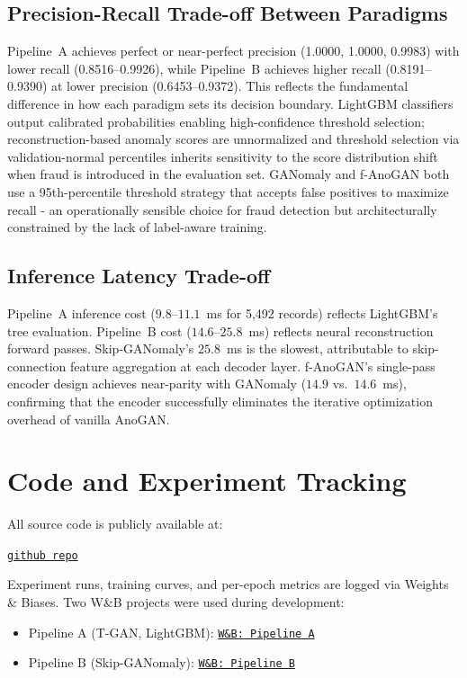 \documentclass[conference]{IEEEtran}
\begin{document}
\subsection{Precision-Recall Trade-off Between Paradigms}

Pipeline~A achieves perfect or near-perfect precision (1.0000, 1.0000,
0.9983) with lower recall (0.8516--0.9926), while Pipeline~B achieves
higher recall (0.8191--0.9390) at lower precision (0.6453--0.9372). This
reflects the fundamental difference in how each paradigm sets its decision
boundary. LightGBM classifiers output calibrated probabilities enabling
high-confidence threshold selection; reconstruction-based anomaly scores
are unnormalized and threshold selection via validation-normal percentiles
inherits sensitivity to the score distribution shift when fraud is introduced
in the evaluation set. GANomaly and f-AnoGAN both use a 95th-percentile
threshold strategy that accepts false positives to maximize recall - an
operationally sensible choice for fraud detection but architecturally
constrained by the lack of label-aware training.

\subsection{Inference Latency Trade-off}

Pipeline~A inference cost ($9.8$--$11.1$~ms for 5,492 records) reflects
LightGBM's tree evaluation. Pipeline~B cost ($14.6$--$25.8$~ms) reflects
neural reconstruction forward passes. Skip-GANomaly's $25.8$~ms is the
slowest, attributable to skip-connection feature aggregation at each decoder
layer. f-AnoGAN's single-pass encoder design achieves near-parity with
GANomaly ($14.9$ vs.\ $14.6$~ms), confirming that the encoder successfully
eliminates the iterative optimization overhead of vanilla AnoGAN.

\section*{Code and Experiment Tracking}

All source code is publicly available at:
\begin{center}
\href{https://github.com/kkipngenokoech/synthesize-or-reconstruct}{\texttt{github repo}}
\end{center}

\noindent Experiment runs, training curves, and per-epoch metrics are logged via
Weights \& Biases. Two W\&B projects were used during development:
\begin{itemize}
  \item Pipeline A (T-GAN, LightGBM):\;
        \href{https://wandb.ai/kkipngenokoech-carnegie-mellon-university/PRINCIPLES%20AND%20ENGINEERING%20APPLICATIONS%20OF%20AI?nw=nwuserkkipngenokoech}{\texttt{W\&B: Pipeline A}}
  \item Pipeline B (Skip-GANomaly):\;
        \href{https://wandb.ai/kkipngenokoech-carnegie-mellon-university/PRINCIPLES%20AND%20ENGINEERING%20%20APPLICATIONS%20OF%20AI?nw=nwuserkkipngenokoech}{\texttt{W\&B: Pipeline B}}
\end{itemize}
\end{document}
